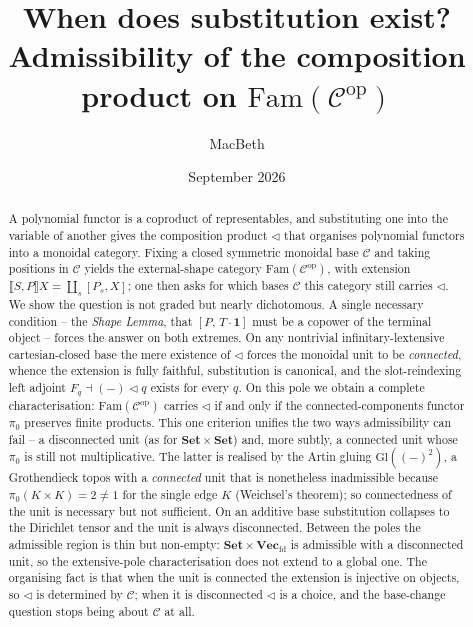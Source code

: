 \documentclass[11pt]{amsart}
\theoremstyle{plain}
\theoremstyle{definition}
\newcommand{\C}{\mathcal{C}}
\newcommand{\Fam}{\mathrm{Fam}}
\newcommand{\ext}[1]{\llbracket #1 \rrbracket}
\newcommand{\Setb}{\mathbf{Set}}
\newcommand{\Vecfd}{\mathbf{Vec}_{\mathrm{fd}}}
\newcommand{\Gl}{\mathrm{Gl}}
\newcommand{\op}{\mathrm{op}}
\newcommand{\comp}{\mathbin{\triangleleft}}
\newcommand{\one}{\mathbf{1}}
\newcommand{\pizero}{\pi_0}
\begin{document}
\title[Admissibility of the composition product over a base]
{When does substitution exist? \\ Admissibility of the composition product on $\Fam(\C^{\op})$}

\author{MacBeth}
\address{Kodamai}

\date{September 2026}

\begin{abstract}
A polynomial functor is a coproduct of representables, and substituting one into the variable
of another gives the composition product $\comp$ that organises polynomial functors into a
monoidal category. Fixing a closed symmetric monoidal base $\C$ and taking positions in $\C$
yields the external-shape category $\Fam(\C^{\op})$, with extension $\ext{S,P}X=\coprod_{s}[P_s,X]$;
one then asks for which bases $\C$ this category still carries $\comp$. We show the question is not
graded but nearly dichotomous. A single necessary condition -- the \emph{Shape Lemma}, that
$[P,\,T\cdot\one]$ must be a copower of the terminal object -- forces the answer on both extremes.
On any nontrivial infinitary-lextensive cartesian-closed base the mere existence of $\comp$ forces
the monoidal unit to be \emph{connected}, whence the extension is fully faithful, substitution is
canonical, and the slot-reindexing left adjoint $F_q\dashv({-})\comp q$ exists for every $q$. On this
pole we obtain a complete characterisation: $\Fam(\C^{\op})$ carries $\comp$ if and only if the
connected-components functor $\pizero$ preserves finite products. This one criterion unifies the two
ways admissibility can fail -- a disconnected unit (as for $\Setb\times\Setb$) and, more subtly, a
connected unit whose $\pizero$ is still not multiplicative. The latter is realised by the Artin
gluing $\Gl((-)^2)$, a Grothendieck topos with a \emph{connected} unit that is nonetheless
inadmissible because $\pizero(K\times K)=2\neq1$ for the single edge $K$ (Weichsel's theorem); so
connectedness of the unit is necessary but not sufficient. On an additive base substitution collapses
to the Dirichlet tensor and the unit is always disconnected. Between the poles the admissible region
is thin but non-empty: $\Setb\times\Vecfd$ is admissible with a disconnected unit, so the
extensive-pole characterisation does not extend to a global one. The organising fact is that when the
unit is connected the extension is injective on objects, so $\comp$ is determined by $\C$; when it is
disconnected $\comp$ is a choice, and the base-change question stops being about $\C$ at all.
\end{abstract}
\end{document}
